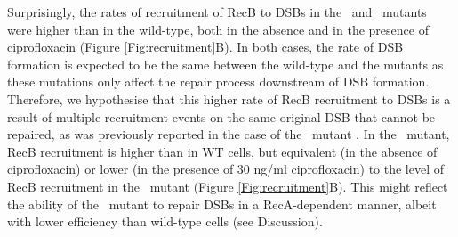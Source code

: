 Surprisingly, the rates of recruitment of RecB to DSBs in the \dreca\ and \geneteneighty\ mutants were higher than in the wild-type, both in the absence and in the presence of ciprofloxacin (Figure \ref{Fig:recruitment}B). In both cases, the rate of DSB formation is expected to be the same between the wild-type and the mutants as these mutations only affect the repair process downstream of DSB formation. Therefore, we hypothesise that this higher rate of RecB recruitment to DSBs is a result of multiple recruitment events on the same original DSB that cannot be repaired, as was previously reported in the case of the \dreca\ mutant \cite{Capaldo1975,Skarstad1993}. In the \geneteneighty\ mutant, RecB recruitment is higher than in WT cells, but equivalent (in the absence of ciprofloxacin) or lower (in the presence of 30 ng/ml ciprofloxacin) to the level of RecB recruitment in the \dreca\ mutant (Figure \ref{Fig:recruitment}B). This might reflect the ability of the \geneteneighty\ mutant to repair DSBs in a RecA-dependent manner, albeit with lower efficiency than wild-type cells (see Discussion).

